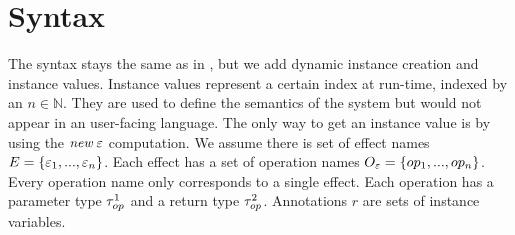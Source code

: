 \newpage
\section{Syntax}
The syntax stays the same as in \cite{effectsystem}, but we add dynamic instance creation and instance values.
Instance values represent a certain index at run-time, indexed by an $n \in \mathbb{N}$.
They are used to define the semantics of the system but would not appear in an user-facing language.
The only way to get an instance value is by using the $\textit{new} \; \varepsilon$ computation.  
We assume there is set of effect names $E = \{ \varepsilon_1, ..., \varepsilon_n \}$.
Each effect has a set of operation names $O_\varepsilon = \{ op_1, ..., op_n \}$.
Every operation name only corresponds to a single effect.
Each operation has a parameter type $\tau^1_{op}$ and a return type $\tau^2_{op}$.
Annotations $r$ are sets of instance variables. 
\\

